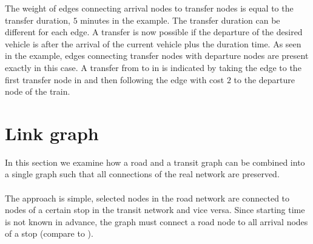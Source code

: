	The weight of edges connecting arrival nodes to transfer nodes is equal to the transfer duration, $5$ minutes in the example.
	The transfer duration can be different for each edge. A transfer is now possible if the departure of the desired vehicle is after
	the arrival of the current vehicle plus the duration time. As seen in the example, edges connecting transfer nodes with departure
	nodes are present exactly in this case. A transfer from \ticef to \tregios in \offenburg is indicated by taking the edge to the
	first transfer node in \offenburg and then following the edge with cost $2$ to the departure node of the train.
\section{Link graph}\label{linkGraph_sec}
	In this section we examine how a road and a transit graph can be combined into a single graph such that all
	connections of the real network are preserved.\\\\
	The approach is simple, selected nodes in the road network are connected to nodes of a certain stop in
	the transit network and vice versa. Since starting time is not known in advance, the graph must connect a
	road node to all arrival nodes of a stop (compare to ).
	
